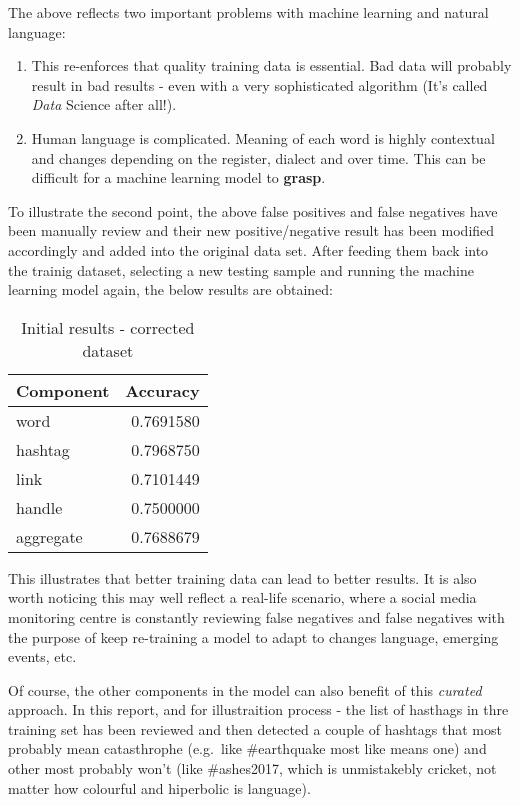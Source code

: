\documentclass[11pt,]{article}
\providecommand{\tightlist}{%
  \setlength{\itemsep}{0pt}\setlength{\parskip}{0pt}}
\begin{document}
The above reflects two important problems with machine learning and
natural language:

\begin{enumerate}
\def\labelenumi{\arabic{enumi}.}
\tightlist
\item
  This re-enforces that quality training data is essential. Bad data
  will probably result in bad results - even with a very sophisticated
  algorithm (It's called \emph{Data} Science after all!).
\item
  Human language is complicated. Meaning of each word is highly
  contextual and changes depending on the register, dialect and over
  time. This can be difficult for a machine learning model to
  \textbf{grasp}.
\end{enumerate}

To illustrate the second point, the above false positives and false
negatives have been manually review and their new positive/negative
result has been modified accordingly and added into the original data
set. After feeding them back into the trainig dataset, selecting a new
testing sample and running the machine learning model again, the below
results are obtained:

\begin{table}[!h]

\caption{\label{tab:fp_acc0}Initial results - corrected dataset}
\centering
\begin{tabular}[t]{lr}
\toprule
Component & Accuracy\\
\midrule
\rowcolor{gray!6}  word & 0.7691580\\
hashtag & 0.7968750\\
\rowcolor{gray!6}  link & 0.7101449\\
handle & 0.7500000\\
\rowcolor{gray!6}  aggregate & 0.7688679\\
\bottomrule
\end{tabular}
\end{table}

This illustrates that better training data can lead to better results.
It is also worth noticing this may well reflect a real-life scenario,
where a social media monitoring centre is constantly reviewing false
negatives and false negatives with the purpose of keep re-training a
model to adapt to changes language, emerging events, etc.

Of course, the other components in the model can also benefit of this
\emph{curated} approach. In this report, and for illustraition process -
the list of hasthags in thre training set has been reviewed and then
detected a couple of hashtags that most probably mean catasthrophe
(e.g.~like \#earthquake most like means one) and other most probably
won't (like \#ashes2017, which is unmistakebly cricket, not matter how
colourful and hiperbolic is language).
\end{document}
